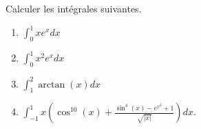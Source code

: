 
\begin{exercice}\label{exoTD5-0004}

	Calculer les intégrales suivantes.

    \begin{multicols}{2}
	
		\begin{enumerate}
			\item
				$\displaystyle\int_0^1xe^xdx$
			\item
				$\displaystyle\int_0^1x^2e^xdx$
			\item
				$\displaystyle\int_1^2\arctan(x)dx$
			\item
				$\displaystyle\int_{-1}^1x\left( \cos^{10}(x)+\frac{ \sin^4(x)- e^{x^2}+1 }{ \sqrt{| x |} } \right)dx$.
		\end{enumerate}
    \end{multicols}

\end{exercice}
